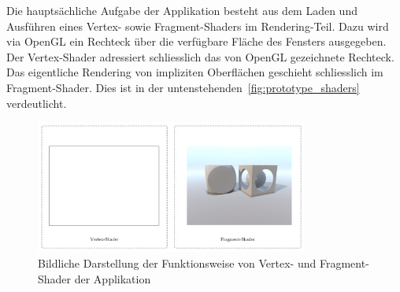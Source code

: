 Die hauptsächliche Aufgabe der Applikation besteht aus dem Laden und
Ausführen eines Vertex- sowie Fragment-Shaders im Rendering-Teil.  Dazu
wird via OpenGL ein Rechteck über die verfügbare Fläche des Fensters
ausgegeben.  Der Vertex-Shader adressiert schliesslich das von OpenGL
gezeichnete Rechteck.  Das eigentliche Rendering von impliziten
Oberflächen geschieht schliesslich im Fragment-Shader. Dies ist in der
untenstehenden~\autoref{fig:prototype_shaders} verdeutlicht.

\begin{figure}[H]
    \centering
    \includegraphics[width=0.8\textwidth]{img/prototype_shaders.pdf}
    \caption{Bildliche Darstellung der Funktionsweise von Vertex- und
        Fragment-Shader der Applikation\protect\footnotemark}\label{fig:prototype_shaders}
\end{figure}
